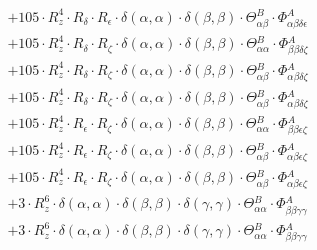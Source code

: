 \documentclass{article}
\begin{document}
\begin{subequations}
\begin{gather}
\begin{array}{c}
 \\[0.2em] 		 + 105 \cdot R_{z}^{4} \cdot R_{\delta{}} \cdot R_{\epsilon{}} \cdot \delta{}\left(\alpha{}, \alpha{}\right) \cdot \delta{}\left(\beta{}, \beta{}\right) \cdot \Theta{}^{B}_{\alpha{}\beta{}} \cdot \Phi{}^{A}_{\alpha{}\beta{}\delta{}\epsilon{}} 
 \\[0.2em] 		 + 105 \cdot R_{z}^{4} \cdot R_{\delta{}} \cdot R_{\zeta{}} \cdot \delta{}\left(\alpha{}, \alpha{}\right) \cdot \delta{}\left(\beta{}, \beta{}\right) \cdot \Theta{}^{B}_{\alpha{}\alpha{}} \cdot \Phi{}^{A}_{\beta{}\beta{}\delta{}\zeta{}} 
 \\[0.2em] 		 + 105 \cdot R_{z}^{4} \cdot R_{\delta{}} \cdot R_{\zeta{}} \cdot \delta{}\left(\alpha{}, \alpha{}\right) \cdot \delta{}\left(\beta{}, \beta{}\right) \cdot \Theta{}^{B}_{\alpha{}\beta{}} \cdot \Phi{}^{A}_{\alpha{}\beta{}\delta{}\zeta{}} 
 \\[0.2em] 		 + 105 \cdot R_{z}^{4} \cdot R_{\delta{}} \cdot R_{\zeta{}} \cdot \delta{}\left(\alpha{}, \alpha{}\right) \cdot \delta{}\left(\beta{}, \beta{}\right) \cdot \Theta{}^{B}_{\alpha{}\beta{}} \cdot \Phi{}^{A}_{\alpha{}\beta{}\delta{}\zeta{}} 
 \\[0.2em] 		 + 105 \cdot R_{z}^{4} \cdot R_{\epsilon{}} \cdot R_{\zeta{}} \cdot \delta{}\left(\alpha{}, \alpha{}\right) \cdot \delta{}\left(\beta{}, \beta{}\right) \cdot \Theta{}^{B}_{\alpha{}\alpha{}} \cdot \Phi{}^{A}_{\beta{}\beta{}\epsilon{}\zeta{}} 
 \\[0.2em] 		 + 105 \cdot R_{z}^{4} \cdot R_{\epsilon{}} \cdot R_{\zeta{}} \cdot \delta{}\left(\alpha{}, \alpha{}\right) \cdot \delta{}\left(\beta{}, \beta{}\right) \cdot \Theta{}^{B}_{\alpha{}\beta{}} \cdot \Phi{}^{A}_{\alpha{}\beta{}\epsilon{}\zeta{}} 
 \\[0.2em] 		 + 105 \cdot R_{z}^{4} \cdot R_{\epsilon{}} \cdot R_{\zeta{}} \cdot \delta{}\left(\alpha{}, \alpha{}\right) \cdot \delta{}\left(\beta{}, \beta{}\right) \cdot \Theta{}^{B}_{\alpha{}\beta{}} \cdot \Phi{}^{A}_{\alpha{}\beta{}\epsilon{}\zeta{}} 
 \\[0.2em] 		 + 3 \cdot R_{z}^{6} \cdot \delta{}\left(\alpha{}, \alpha{}\right) \cdot \delta{}\left(\beta{}, \beta{}\right) \cdot \delta{}\left(\gamma{}, \gamma{}\right) \cdot \Theta{}^{B}_{\alpha{}\alpha{}} \cdot \Phi{}^{A}_{\beta{}\beta{}\gamma{}\gamma{}} 
 \\[0.2em] 		 + 3 \cdot R_{z}^{6} \cdot \delta{}\left(\alpha{}, \alpha{}\right) \cdot \delta{}\left(\beta{}, \beta{}\right) \cdot \delta{}\left(\gamma{}, \gamma{}\right) \cdot \Theta{}^{B}_{\alpha{}\alpha{}} \cdot \Phi{}^{A}_{\beta{}\beta{}\gamma{}\gamma{}} 

\end{array}
\end{gather}
\end{subequations}
\end{document}
